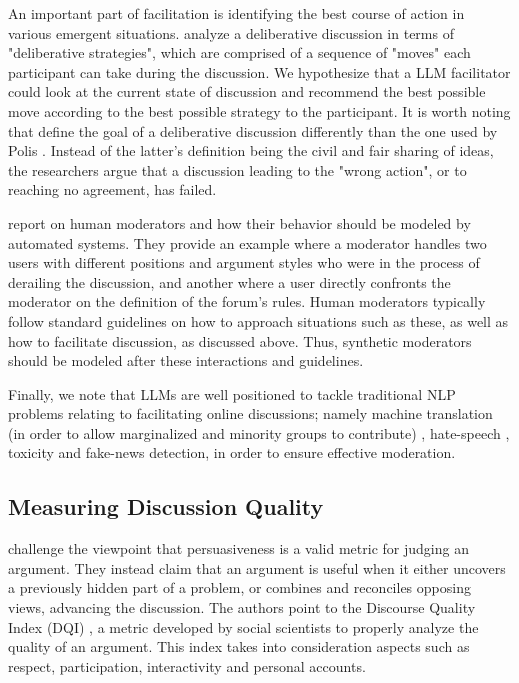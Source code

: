 An important part of facilitation is identifying the best course of action in various emergent situations. \citet{al-khatib-etal-2018-modeling} analyze a deliberative discussion in terms of "deliberative strategies", which are comprised of a sequence of "moves" each participant can take during the discussion. We hypothesize that a LLM facilitator could look at the current state of discussion and recommend the best possible move according to the best possible strategy to the participant. It is worth noting that \citet{al-khatib-etal-2018-modeling} define the goal of a deliberative discussion differently than the one used by Polis \cite{small-polis-llm}. Instead of the latter's definition being the civil and fair sharing of ideas, the researchers argue that a discussion leading to the "wrong action", or to reaching no agreement, has failed.

\citet{vecchi-2021-towards} report on human moderators and how their behavior should be modeled by automated systems. They provide an example where a moderator handles two users with different positions and argument styles who were in the process of derailing the discussion, and another where a user directly confronts the moderator on the definition of the forum's rules. Human moderators typically follow standard guidelines on how to approach situations such as these, as well as how to facilitate discussion, as discussed above. Thus, synthetic moderators should be modeled after these interactions and guidelines.

Finally, we note that LLMs are well positioned to tackle traditional \ac{NLP} problems relating to facilitating online discussions; namely machine translation (in order to allow marginalized and minority groups to contribute) \cite{Tsai2024Generative}, hate-speech \cite{Nirmal2024TowardsIH, shi-2024-hatespeech}, toxicity \cite{kang-qian-2024-implanting, Wang2022ToxicityDW} and fake-news \cite{Liu2024DetectIJ, Xu2024ACS} detection, in order to ensure effective moderation. 


\subsection{Measuring Discussion Quality}
\label{sec:related:measures}

\citet{vecchi-2021-towards} challenge the viewpoint that persuasiveness is a valid metric for judging an argument. They instead claim that an argument is useful when it either uncovers a previously hidden part of a problem, or combines and reconciles opposing views, advancing the discussion. The authors point to the Discourse Quality Index (DQI) \cite{Steiner2005-STEDPI-8, stab-gurevych-2017-parsing}, a metric developed by social scientists to properly analyze the quality of an argument. This index takes into consideration aspects such as respect, participation, interactivity and personal accounts.

